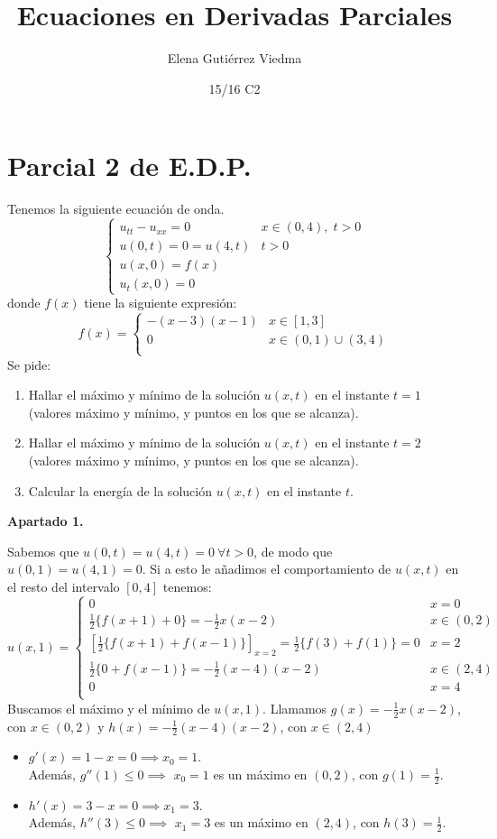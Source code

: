 \documentclass[bibnumbers, palatino]{apuntes}
\title{Ecuaciones en Derivadas Parciales}
\author{Elena Gutiérrez Viedma}
\date{15/16 C2}
\begin{document}
\pagestyle{plain}

\section{Parcial 2 de E.D.P.}

\begin{problem} Tenemos la siguiente ecuación de onda. \[ \begin{cases}
u_{tt} - u_{xx} = 0	& x \in (0,4),\; t > 0 \\
u(0,t) = 0 = u(4,t) & t > 0 \\
u(x,0) = f(x)\\
u_t(x,0) = 0 	
\end{cases} \]
donde $f(x)$ tiene la siguiente expresión:
\[ f(x) = \begin{cases}
-(x-3)(x-1)	& x \in [1,3]\\
0 & x \in (0,1)\cup(3,4)\\
\end{cases} \]
Se pide:
\begin{enumerate}
\item Hallar el máximo y mínimo de la solución $u(x,t)$ en el instante $t=1$ (valores máximo y mínimo, y puntos en los que se alcanza).
\item Hallar el máximo y mínimo de la solución $u(x,t)$ en el instante $t=2$ (valores máximo y mínimo, y puntos en los que se alcanza).
\item Calcular la energía de la solución $u(x,t)$ en el instante $t$.
\end{enumerate}
\solution
\textbf{Apartado 1.} \newline

Sabemos que $u(0,t)=u(4,t)=0~\forall t>0$, de modo que $u(0,1)=u(4,1)=0$. Si a esto le añadimos el comportamiento de $u(x,t)$ en el resto del intervalo $[0,4]$ tenemos:
\[ u(x,1) = \begin{cases}
0	& x=0\\
\frac{1}{2}\{f(x+1)+0\}=-\frac{1}{2}x(x-2)	& x \in (0,2)\\
[\frac{1}{2}\{f(x+1)+f(x-1)\}]_{x=2}=\frac{1}{2}\{f(3)+f(1)\}=0	& x=2\\
\frac{1}{2}\{0+f(x-1)\}=-\frac{1}{2}(x-4)(x-2)	& x \in (2,4)\\
0	& x=4\\
\end{cases} \]
Buscamos el máximo y el mínimo de $u(x,1)$. Llamamos $g(x) = -\frac{1}{2}x(x-2) $, con $x\in (0,2)$ y $h(x)=-\frac{1}{2}(x-4)(x-2)$, con $x\in (2,4)$
\begin{itemize}
\item $g'(x) = 1-x = 0 \implies x_0 = 1$.\\ Además, $g''(1) \leq 0 \implies$ $x_0 = 1$ es un máximo en $(0,2)$, con $g(1)=\frac{1}{2}$.
\item $h'(x) = 3-x = 0 \implies x_1 = 3$.\\ Además, $h''(3) \leq 0 \implies$ $x_1 = 3$ es un máximo en $(2,4)$, con $h(3)=\frac{1}{2}$.
\end{itemize}


\end{problem}
\end{document}
